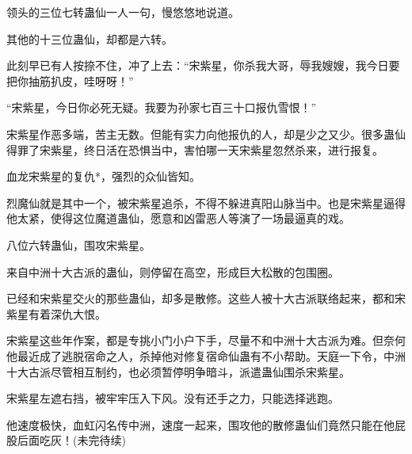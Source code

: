 \begin{this_body}
领头的三位七转蛊仙一人一句，慢悠悠地说道。

其他的十三位蛊仙，却都是六转。

此刻早已有人按捺不住，冲了上去：“宋紫星，你杀我大哥，辱我嫂嫂，我今日要把你抽筋扒皮，哇呀呀！”

“宋紫星，今日你必死无疑。我要为孙家七百三十口报仇雪恨！”

宋紫星作恶多端，苦主无数。但能有实力向他报仇的人，却是少之又少。很多蛊仙得罪了宋紫星，终日活在恐惧当中，害怕哪一天宋紫星忽然杀来，进行报复。

血龙宋紫星的复仇*，强烈的众仙皆知。

烈魔仙就是其中一个，被宋紫星追杀，不得不躲进真阳山脉当中。也是宋紫星逼得他太紧，使得这位魔道蛊仙，愿意和凶雷恶人等演了一场最逼真的戏。

八位六转蛊仙，围攻宋紫星。

来自中洲十大古派的蛊仙，则停留在高空，形成巨大松散的包围圈。

已经和宋紫星交火的那些蛊仙，却多是散修。这些人被十大古派联络起来，都和宋紫星有着深仇大恨。

宋紫星这些年作案，都是专挑小门小户下手，尽量不和中洲十大古派为难。但奈何他最近成了逃脱宿命之人，杀掉他对修复宿命仙蛊有不小帮助。天庭一下令，中洲十大古派尽管相互制约，也必须暂停明争暗斗，派遣蛊仙围杀宋紫星。

宋紫星左遮右挡，被牢牢压入下风。没有还手之力，只能选择逃跑。

他速度极快，血虹闪名传中洲，速度一起来，围攻他的散修蛊仙们竟然只能在他屁股后面吃灰！(未完待续)

\end{this_body}

